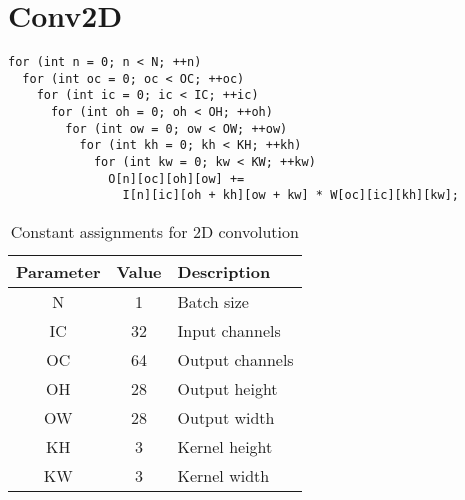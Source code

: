 \documentclass[conference]{article}
\begin{document}
\section{Conv2D}
\begin{verbatim}
for (int n = 0; n < N; ++n)
  for (int oc = 0; oc < OC; ++oc)
    for (int ic = 0; ic < IC; ++ic)
      for (int oh = 0; oh < OH; ++oh)
        for (int ow = 0; ow < OW; ++ow)
          for (int kh = 0; kh < KH; ++kh)
            for (int kw = 0; kw < KW; ++kw)
              O[n][oc][oh][ow] +=
                I[n][ic][oh + kh][ow + kw] * W[oc][ic][kh][kw];
\end{verbatim}

\begin{table}[h]
\centering
\begin{tabular}{|c|c|l|}
\hline
Parameter & Value & Description \\
\hline
 N & 1 & Batch size \\
IC & 32 & Input channels \\
OC & 64 & Output channels \\
OH & 28 & Output height \\
OW & 28 & Output width \\
KH & 3 & Kernel height \\
KW & 3 & Kernel width \\
\hline
\end{tabular}
\caption{Constant assignments for 2D convolution}
\end{table}
\end{document}
